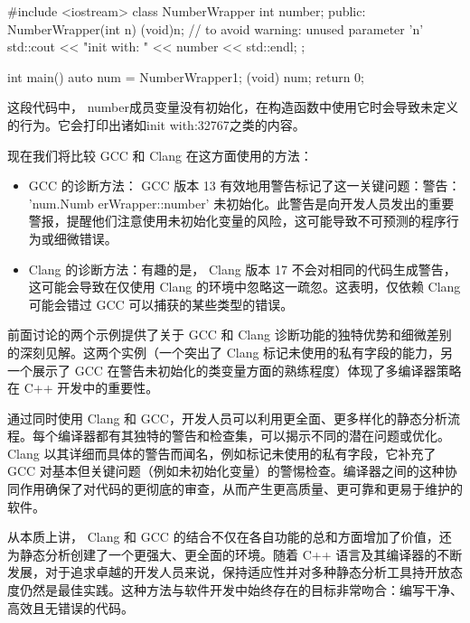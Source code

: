 \begin{cpp}
#include <iostream>
class NumberWrapper {
    int number;
    public:
    NumberWrapper(int n) {
        (void)n; // to avoid warning: unused parameter 'n'
        std::cout << "init with: " << number << std::endl;
    }
};

int main() {
    auto num = NumberWrapper{1};
    (void) num;
    return 0;
}
\end{cpp}

这段代码中， number成员变量没有初始化，在构造函数中使用它时会导致未定义的行为。它会打印出诸如init with:32767之类的内容。

现在我们将比较 GCC 和 Clang 在这方面使用的方法：

\begin{itemize}
\item
GCC 的诊断方法： GCC 版本 13 有效地用警告标记了这一关键问题：警告： 'num.Numb erWrapper::number' 未初始化。此警告是向开发人员发出的重要警报，提醒他们注意使用未初始化变量的风险，这可能导致不可预测的程序行为或细微错误。

\item
Clang 的诊断方法：有趣的是， Clang 版本 17 不会对相同的代码生成警告，这可能会导致在仅使用 Clang 的环境中忽略这一疏忽。这表明，仅依赖 Clang 可能会错过 GCC 可以捕获的某些类型的错误。
\end{itemize}

前面讨论的两个示例提供了关于 GCC 和 Clang 诊断功能的独特优势和细微差别的深刻见解。这两个实例（一个突出了 Clang 标记未使用的私有字段的能力，另一个展示了 GCC 在警告未初始化的类变量方面的熟练程度）体现了多编译器策略在 C++ 开发中的重要性。

通过同时使用 Clang 和 GCC，开发人员可以利用更全面、更多样化的静态分析流程。每个编译器都有其独特的警告和检查集，可以揭示不同的潜在问题或优化。 Clang 以其详细而具体的警告而闻名，例如标记未使用的私有字段，它补充了 GCC 对基本但关键问题（例如未初始化变量）的警惕检查。编译器之间的这种协同作用确保了对代码的更彻底的审查，从而产生更高质量、更可靠和更易于维护的软件。

从本质上讲， Clang 和 GCC 的结合不仅在各自功能的总和方面增加了价值，还为静态分析创建了一个更强大、更全面的环境。随着 C++ 语言及其编译器的不断发展，对于追求卓越的开发人员来说，保持适应性并对多种静态分析工具持开放态度仍然是最佳实践。这种方法与软件开发中始终存在的目标非常吻合：编写干净、高效且无错误的代码。
















